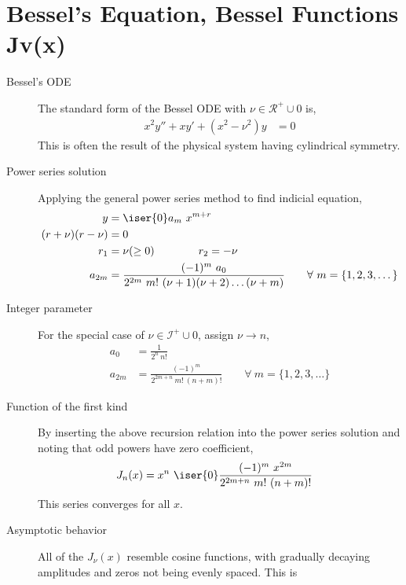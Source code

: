 \section{Bessel's Equation, Bessel Functions Jv(x)}
\begin{description}
    \item[Bessel's ODE] The standard form of the Bessel ODE with
        $ \nu \in \mathcal{R^+} \cup 0 $ is,
        \begin{align}
            x^2y'' + xy' + (x^2 - \nu^2)y & = 0
        \end{align}
        This is often the result of the physical system having cylindrical symmetry.
    \item[Power series solution] Applying the general power series method to find
        indicial equation,
        \begin{align}
            y                & = \iser{0} a_m\ x^{m+r} \\
            (r + \nu)(r-\nu) & = 0                     \\
            r_1              & = \nu (\geq 0)
            \qquad \qquad r_2 = -\nu                   \\
            a_{2m}           & = \frac{(-1)^m\ a_0}
            {2^{2m}\ m!\ (\nu+1)(\nu+2)\dots(\nu+m)}
            \qquad \forall\ m=\{1,2,3,\dots\}
        \end{align}
    \item[Integer parameter] For the special case of $ \nu \in \mathcal{I^+} \cup 0 $,
        assign $ \nu \to n $,
        \begin{align}
            a_0    & = \frac{1}{2^n\ n!}                          \\
            a_{2m} & = \frac{(-1)^m}{2^{2m+n}\ m!\ (n+m)!} \qquad
            \forall\ m= \{1,2,3,\dots\}
        \end{align}
    \item[Function of the first kind] By inserting the above recursion relation into the
        power series solution and noting that odd powers have zero coefficient,
        \begin{align}
            J_n(x) & = x^n\ \iser{0} \frac{(-1)^m\ x^{2m}}{2^{2m+n}\ m!\ (n+m)!}
        \end{align}
        This series converges for all $ x $.
    \item[Asymptotic behavior] All of the $ J_{\nu}(x) $ resemble cosine functions,
        with gradually decaying amplitudes and zeros not being evenly spaced. This is

\end{description}
